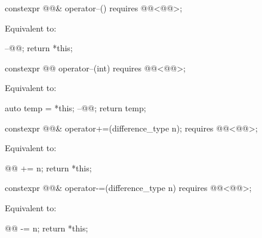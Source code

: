 %
\begin{itemdecl}
constexpr @@& operator--() requires @@<@@>;
\end{itemdecl}

\begin{itemdescr}
\pnum
\effects
Equivalent to:
\begin{codeblock}
--@@;
return *this;
\end{codeblock}
\end{itemdescr}

%
\begin{itemdecl}
constexpr @@ operator--(int) requires @@<@@>;
\end{itemdecl}

\begin{itemdescr}
\pnum
\effects
Equivalent to:
\begin{codeblock}
auto temp = *this;
--@@;
return temp;
\end{codeblock}
\end{itemdescr}

%
\begin{itemdecl}
constexpr @@& operator+=(difference_type n);
  requires @@<@@>;
\end{itemdecl}

\begin{itemdescr}
\pnum
\effects
Equivalent to:
\begin{codeblock}
@@ += n;
return *this;
\end{codeblock}
\end{itemdescr}

%
\begin{itemdecl}
constexpr @@& operator-=(difference_type n)
  requires @@<@@>;
\end{itemdecl}

\begin{itemdescr}
\pnum
\effects
Equivalent to:
\begin{codeblock}
@@ -= n;
return *this;
\end{codeblock}
\end{itemdescr}


